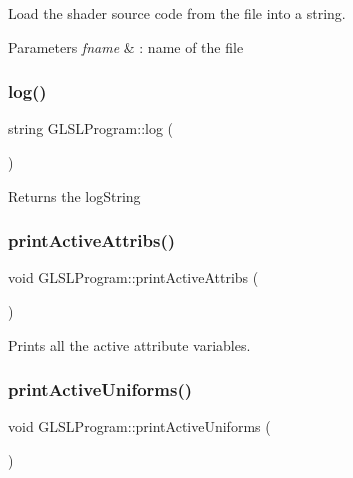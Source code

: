 Load the shader source code from the file into a string. 


\begin{DoxyParams}{Parameters}
{\em fname} & \+: name of the file \\
\hline
\end{DoxyParams}
\hypertarget{class_g_l_s_l_program_ac03cbf803fbcc60d3ff4b3b6d4ecbaa6}{}\label{class_g_l_s_l_program_ac03cbf803fbcc60d3ff4b3b6d4ecbaa6} 
\subsubsection{\texorpdfstring{log()}{log()}}
{\footnotesize\ttfamily string G\+L\+S\+L\+Program\+::log (\begin{DoxyParamCaption}{ }\end{DoxyParamCaption})}

Returns the log\+String \hypertarget{class_g_l_s_l_program_aab7c8bc0e5d0b75a9eb0c60de3cda5b5}{}\label{class_g_l_s_l_program_aab7c8bc0e5d0b75a9eb0c60de3cda5b5} 
\subsubsection{\texorpdfstring{print\+Active\+Attribs()}{printActiveAttribs()}}
{\footnotesize\ttfamily void G\+L\+S\+L\+Program\+::print\+Active\+Attribs (\begin{DoxyParamCaption}{ }\end{DoxyParamCaption})}



Prints all the active attribute variables. 

\hypertarget{class_g_l_s_l_program_a75e11d36a5b634c58a84caa96c9c38e4}{}\label{class_g_l_s_l_program_a75e11d36a5b634c58a84caa96c9c38e4} 
\subsubsection{\texorpdfstring{print\+Active\+Uniforms()}{printActiveUniforms()}}
{\footnotesize\ttfamily void G\+L\+S\+L\+Program\+::print\+Active\+Uniforms (\begin{DoxyParamCaption}{ }\end{DoxyParamCaption})}



